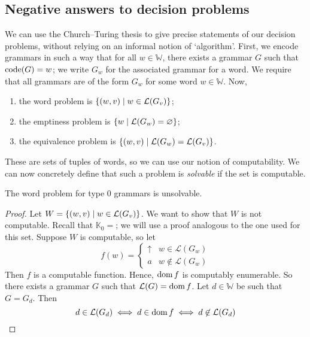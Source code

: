 \subsection{Negative answers to decision problems}
We can use the Church--Turing thesis to give precise statements of our decision problems, without relying on an informal notion of `algorithm'.
First, we encode grammars in such a way that for all \( w \in \mathbb W \), there exists a grammar \( G \) such that \( \operatorname{code}(G) = w \); we write \( G_w \) for the associated grammar for a word.
We require that all grammars are of the form \( G_w \) for some word \( w \in \mathbb W \).
Now,
\begin{enumerate}
	\item the word problem is \( \qty{(w, v) \mid w \in \mathcal L(G_v)} \);
	\item the emptiness problem is \( \qty{w \mid \mathcal L(G_w) = \varnothing} \);
	\item the equivalence problem is \( \qty{(w, v) \mid \mathcal L(G_w) = \mathcal L(G_v)} \).
\end{enumerate}
These are sets of tuples of words, so we can use our notion of computability.
We can now concretely define that such a problem is \emph{solvable} if the set is computable.
\begin{theorem}
	The word problem for type 0 grammars is unsolvable.
\end{theorem}
\begin{proof}
	Let \( W = \qty{(w, v) \mid w \in \mathcal L(G_v)} \).
	We want to show that \( W \) is not computable.
	Recall that \( \mathbb K_0 = \); we will use a proof analogous to the one used for this set.
	Suppose \( W \) is computable, so let
	\[ f(w) = \begin{cases}
		\uparrow & w \in \mathcal L(G_w) \\
		a & w \not\in \mathcal L(G_w)
	\end{cases} \]
	Then \( f \) is a computable function.
	Hence, \( \operatorname{dom} f \) is computably enumerable.
	So there exists a grammar \( G \) such that \( \mathcal L(G) = \operatorname{dom} f \).
	Let \( d \in \mathbb W \) be such that \( G = G_d \).
	Then
	\[ d \in \mathcal L(G_d) \iff d \in \operatorname{dom} f \iff d \not\in \mathcal L(G_d) \]
\end{proof}


